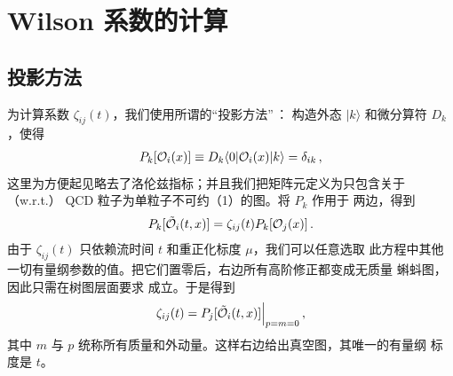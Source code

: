 \section{Wilson 系数的计算}\label{sec:calc}

\subsection{投影方法}

为计算系数 $\zeta_{ij}(t)$，我们使用所谓的``投影方法''\,\cite{Gorishnii:1983su,Gorishnii:1986gn}：
构造外态 $|k\rangle$ 和微分算符 $D_k$，使得
\begin{equation}
  \begin{split}
    P_{k}[\mathcal{O}_{i} (x) ] \equiv D_{k}\langle
    0|\mathcal{O}_{i} (x) |k\rangle =
    \delta_{ik}\,,
    \label{eq:projectors}
  \end{split}
\end{equation}
这里为方便起见略去了洛伦兹指标；并且我们把矩阵元定义为只包含关于（w.r.t.）
QCD 粒子为单粒子不可约（1）的图。将 $P_{k}$ 作用于
 两边，得到
\begin{equation}
  \begin{split}
    P_{k}[\tilde{\mathcal{O}}_{i}(t,x)] =
    \zeta_{ij}(t)P_{k}[\mathcal{O}_{j}(x)]\,.
    \label{eq:project}
  \end{split}
\end{equation}
由于 $\zeta_{ij}(t)$ 只依赖流时间 $t$ 和重正化标度 $\mu$，我们可以任意选取
此方程中其他一切有量纲参数的值。把它们置零后，右边所有高阶修正都变成无质量
蝌蚪图，因此只需在树图层面要求  成立。于是得到
\begin{equation}
  \begin{split}
    \zeta_{ij}(t) = P_j[\tilde{\mathcal{O}}_i(t,x)]\Big|_{p=m=0}\,,
  \end{split}
\end{equation}
其中 $m$ 与 $p$ 统称所有质量和外动量。这样右边给出真空图，其唯一的有量纲
标度是 $t$。

